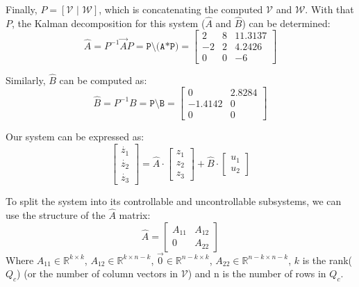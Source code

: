 \documentclass[10pt]{article}
\begin{document}
Finally, $P = [\mathcal{V} \text{ | } \mathcal{W}]$, which is concatenating the computed $\mathcal{V}$ and $\mathcal{W}$. With that $P$, the Kalman decomposition for this system ($\hat{A}$ and $\hat{B}$) can be determined:
\begin{equation*}
    \hat{A} = P^{-1}\vec{A}P = \texttt{P\textbackslash(A*P)} = 
    \begin{bmatrix}
        2 & 8 & 11.3137 \\
        -2 & 2 & 4.2426 \\ 
        0 & 0 & -6
    \end{bmatrix}
\end{equation*}

Similarly, $\hat{B}$ can be computed as:
\begin{equation*}
    \hat{B} = P^{-1}B = \texttt{P\textbackslash B} = 
    \begin{bmatrix}
        0 & 2.8284 \\
        -1.4142 & 0 \\ 
        0 & 0 
    \end{bmatrix}
\end{equation*}

Our system can be expressed as:
\begin{equation*}
    \begin{bmatrix}
        \dot{z_1} \\
        \dot{z_2} \\
        \dot{z_3}
    \end{bmatrix}
    = 
    \hat{A} \cdot \begin{bmatrix}
        z_1\\z_2\\z_3
    \end{bmatrix} +
    \hat{B} \cdot \begin{bmatrix}
        u_1 \\ u_2
    \end{bmatrix}
\end{equation*}

To split the system into its controllable and uncontrollable subsystems, we can use the structure of the $\hat{A}$ matrix:
\begin{equation*}
    \hat{A} = 
    \begin{bmatrix}
        A_{11} & A_{12}\\
        0 & A_{22}
    \end{bmatrix}
\end{equation*}
Where $A_{11} \in \mathbb{R}^{k\times k}$, $A_{12} \in \mathbb{R}^{k \times n-k}$, $\vec{0} \in \mathbb{R}^{n-k \times k}$, $A_{22} \in \mathbb{R}^{n-k \times n-k}$, $k$ is the rank($Q_c$) (or the number of column vectors in $\mathcal{V}$) and n is the number of rows in $Q_c$.
\end{document}
